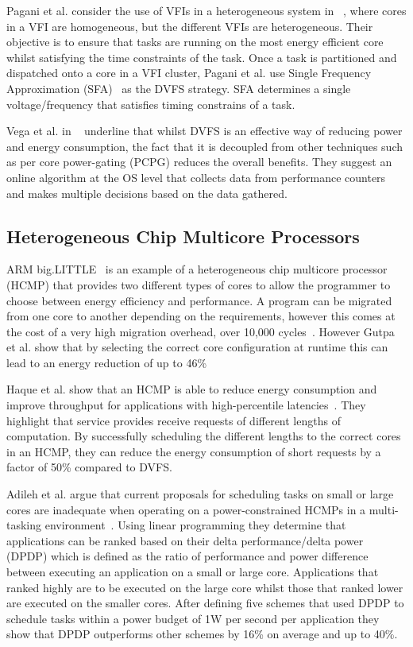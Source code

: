 Pagani et al. consider the use of VFIs in a heterogeneous system in ~\cite{paganiEECHM2017}, where cores in a VFI are homogeneous, but the different VFIs are heterogeneous.
Their objective is to ensure that tasks are running on the most energy efficient core whilst satisfying the time constraints of the task.
Once a task is partitioned and dispatched onto a core in a VFI cluster, Pagani et al. use Single Frequency Approximation (SFA)~\cite{sfaScheme} as the DVFS strategy.
SFA determines a single voltage/frequency that satisfies timing constrains of a task.


Vega et al. in ~\cite{vega2013crank} underline that whilst DVFS is an effective way of reducing power and energy consumption, the fact that it is decoupled from other techniques such as per core power-gating (PCPG) reduces the overall benefits.
They suggest an online algorithm at the OS level that collects data from performance counters and makes multiple decisions based on the data gathered.

\subsection{Heterogeneous Chip Multicore Processors}
ARM big.LITTLE~\cite{armbig} is an example of a heterogeneous chip multicore processor (HCMP) that provides two different types of cores to allow the programmer to choose between energy efficiency and performance.
A program can be migrated from one core to another depending on the requirements, however this comes at the cost of a very high migration overhead, over 10,000 cycles~\cite{armbig}.
However Gutpa et al. show that by selecting the correct core configuration at runtime this can lead to an energy reduction of up to 46\%

Haque et al. show that an HCMP is able to reduce energy consumption and improve throughput for applications with high-percentile latencies~\cite{tailAMP2017}.
They highlight that service provides receive requests of different lengths of computation.
By successfully scheduling the different lengths to the correct cores in an HCMP, they can reduce the energy consumption of short requests by a factor of 50\% compared to DVFS.


Adileh et al. argue that current proposals for scheduling tasks on small or large cores are inadequate when operating on a power-constrained HCMPs in a multi-tasking environment~\cite{adileh2016power}.
Using linear programming they determine that applications can be ranked based on their delta performance/delta power (DPDP) which is defined as the ratio of performance and power difference between executing an application on a small or large core.
Applications that ranked highly are to be executed on the large core whilst those that ranked lower are executed on the smaller cores.
After defining five schemes that used DPDP to schedule tasks within a power budget of 1W per second per application they show that DPDP outperforms other schemes by 16\% on average and up to 40\%.
 
